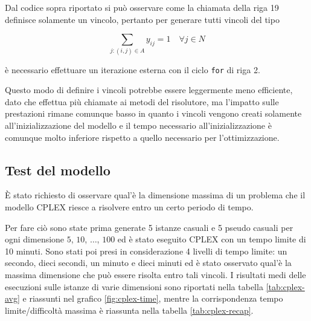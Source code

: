 \noindent Dal codice sopra riportato si può osservare come la chiamata della riga 19 definisce solamente un vincolo, pertanto per generare tutti vincoli del tipo

$$
\sum\limits_{j : (i,j) \in A} y_{ij} = 1 \quad \forall j \in N
$$

\noindent è necessario effettuare un iterazione esterna con il ciclo \texttt{for} di riga 2.

Questo modo di definire i vincoli potrebbe essere leggermente meno efficiente, dato che effettua più chiamate ai metodi del risolutore, ma l'impatto sulle prestazioni rimane comunque basso in quanto i vincoli vengono creati solamente all'inizializzazione del modello e il tempo necessario all'inizializzazione è comunque molto inferiore rispetto a quello necessario per l'ottimizzazione.

\subsection{Test del modello}

\`E stato richiesto di osservare qual'è la dimensione massima di un problema che il modello CPLEX riesce a risolvere entro un certo periodo di tempo.

Per fare ciò sono state prima generate 5 istanze casuali e 5 pseudo casuali per ogni dimensione $5$, $10$, $\ldots$, $100$ ed è stato eseguito CPLEX con un tempo limite di 10 minuti. Sono stati poi presi in considerazione 4 livelli di tempo limite: un secondo, dieci secondi, un minuto e dieci minuti ed è stato osservato qual'è la massima dimensione che può essere risolta entro tali vincoli.
I risultati medi delle esecuzioni sulle istanze di varie dimensioni sono riportati nella tabella \ref{tab:cplex-avg} e riassunti nel grafico \ref{fig:cplex-time}, mentre la corrispondenza tempo limite/difficoltà massima è riassunta nella tabella \ref{tab:cplex-recap}.

